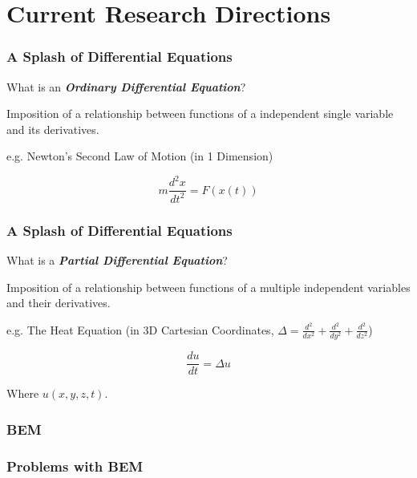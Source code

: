 \section{Current Research Directions}

\begin{frame}
    \frametitle{A Splash of Differential Equations}

    What is an \textit{\textbf{Ordinary Differential Equation}}?

    \vline

    Imposition of a relationship between functions of a independent single variable and its derivatives.

    \vline

    e.g. Newton's Second Law of Motion (in 1 Dimension)

    \begin{equation}
        m \frac{d^2x}{dt^2} = F(x(t))
    \end{equation}

\end{frame}



\begin{frame}
    \frametitle{A Splash of Differential Equations}

    What is a \textit{\textbf{Partial Differential Equation}}?

    \vline

    Imposition of a relationship between functions of a multiple independent variables and their derivatives.

    \vline

    e.g. The Heat Equation (in 3D Cartesian Coordinates, $\Delta = \frac{d^2}{dx^2} + \frac{d^2}{dy^2} + \frac{d^2}{dz^2}$)

    \begin{equation}
        \frac{du}{dt} = \Delta u
    \end{equation}

    \vline

    Where $u(x, y, z, t)$.

\end{frame}

\begin{frame}
    \frametitle{BEM}
\end{frame}


\begin{frame}
    \frametitle{Problems with BEM}
\end{frame}



